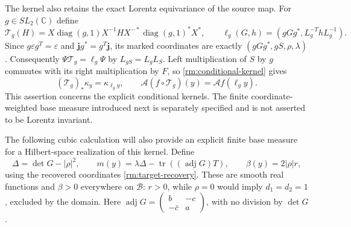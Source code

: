 The kernel also retains the exact Lorentz equivariance of the source
map. For $g\in SL_2(\mathbb C)$ define
\[
 \mathcal T_g(H)=X\operatorname{diag}(g,1)X^{-1}
           H X^{-*}\operatorname{diag}(g,1)^*X^*,\qquad
 \ell_g(G,h)=(gGg^*,L_g^{-T}hL_g^{-1}).
\]
Since $g\varepsilon g^T=\varepsilon$ and
$\mathbf jg^*=g^T\mathbf j$, its marked coordinates are exactly
$(gGg^*,gS,\rho,\lambda)$. Consequently
$\Psi\mathcal T_g=\ell_g\Psi$ by $L_{gS}=L_gL_S$.
Left multiplication of $S$ by $g$ commutes with its right
multiplication by $F$, so \eqref{rm:conditional-kernel} gives
\begin{equation}\label{rm:kernel-equivariance}
 (\mathcal T_g)_*\kappa_y=\kappa_{\ell_g y},\qquad
 \mathcal A(f\circ\mathcal T_g)(y)=\mathcal A f(\ell_g y).
\end{equation}
This assertion concerns the explicit conditional kernels. The finite
coordinate-weighted base measure introduced next is separately
specified and is not asserted to be Lorentz invariant.

The following cubic calculation will also provide an explicit finite
base measure for a Hilbert-space realization of this kernel. Define
\begin{equation}\label{rm:mean-radius-definitions}
 \Delta=\det G-|\rho|^2,\qquad
 m(y)=\lambda\Delta-\operatorname{tr}((\operatorname{adj}G)T),
 \qquad\beta(y)=2|\rho|r,
\end{equation}
using the recovered coordinates \eqref{rm:target-recovery}. These are
smooth real functions and $\beta>0$ everywhere on $\mathcal B$:
$r>0$, while $\rho=0$ would imply $d_1=d_2=1$, excluded by the domain.
Here $\operatorname{adj}G=\left(\begin{smallmatrix}b&-c\\-\bar c&a
\end{smallmatrix}\right)$, with no division by $\det G$.


